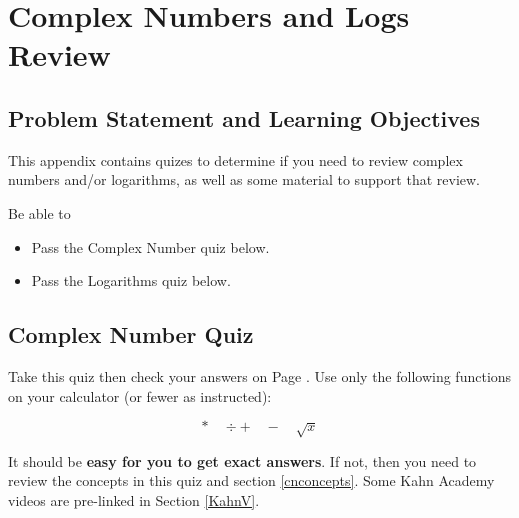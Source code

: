 %
%
%

\chapter{Complex Numbers and Logs Review}

\section{Problem Statement and Learning Objectives}
This appendix contains quizes to determine if you need to review complex numbers and/or logarithms, as well as some material to support that review.

Be able to
\begin{itemize}
    \item Pass the Complex Number quiz below.
    \item Pass the Logarithms quiz below. 
\end{itemize}

\section{Complex Number Quiz}\label{ComplexNumberReview}
Take this quiz then check your answers on Page \pageref{CN_answers}.  Use only the following functions on your calculator (or fewer as instructed):

\[
* \quad \div + \quad - \quad \sqrt{x}
\]


It should be {\bf easy for you to get exact answers}.  If not, then you need to review the concepts in this quiz and section \ref{cnconcepts}.   Some Kahn Academy videos are pre-linked in Section \ref{KahnV}.


